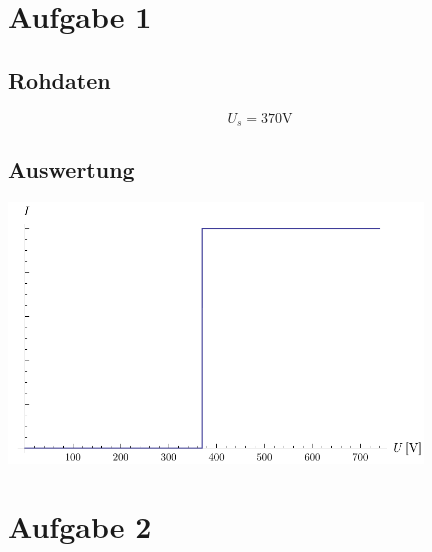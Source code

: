 \documentclass[12pt,a4paper]{article}
\begin{document}
\section*{Aufgabe 1}
\subsection*{Rohdaten}
\[ U_s = 370 \mbox{V} \]

\subsection*{Auswertung}
\begin{center}
\includegraphics[width=11cm]{diagram1.pdf}
\end{center}


\section*{Aufgabe 2}
\end{document}
